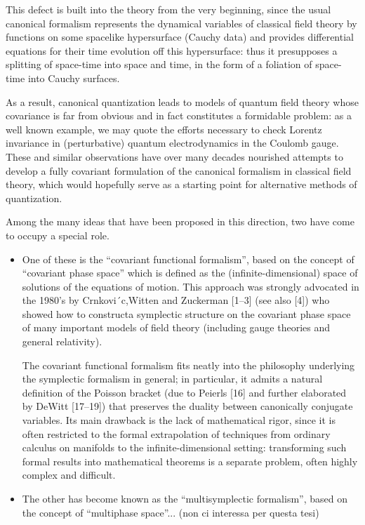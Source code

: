 \documentclass[Cascione]{subfiles}
\begin{document}
			This defect is built into the theory from the very beginning, since the usual canonical formalism represents the dynamical variables of classical field theory by functions on some spacelike hypersurface (Cauchy data) and provides differential equations for their time evolution off this hypersurface: thus it presupposes a splitting of space-time into space and time, in the form of a foliation of space-time into Cauchy surfaces.
			
			As a result, canonical quantization leads to models of quantum field theory whose covariance is far from obvious and in fact constitutes a formidable problem: as a well known example, we may quote the efforts necessary to check Lorentz invariance in (perturbative) quantum electrodynamics in the Coulomb gauge. \\
			These and similar observations have over many decades nourished attempts to develop a fully covariant formulation of the canonical formalism in classical field theory, which would hopefully serve as a starting point for alternative methods of quantization.
			
			Among the many ideas that have been proposed in this direction, two have come to occupy a special role. 
			\begin{itemize}
				\item  One of these is the “covariant functional formalism”, based on the concept 	of “covariant phase space” which is defined as the (infinite-dimensional) space of solutions of the equations of motion.
					This approach was strongly advocated in the 1980’s by Crnkovi´c,Witten and Zuckerman [1–3] (see also [4]) who showed how to constructa symplectic structure on the covariant phase space of many important models of field theory (including gauge theories and general relativity).
				
					The covariant functional formalism fits neatly into the philosophy underlying the symplectic formalism in general; in particular, it admits a natural definition of the Poisson bracket (due to Peierls [16] and further elaborated by DeWitt [17–19]) that preserves the duality between canonically conjugate variables. 
					Its main drawback is the lack of mathematical rigor, since it is often restricted to the formal extrapolation of techniques from ordinary calculus on manifolds to the infinite-dimensional setting: transforming such formal results into mathematical theorems is a separate problem, often highly complex and difficult.
					
				\item The other has become known as the “multisymplectic formalism”, based on the concept of “multiphase space”... (non ci interessa per questa tesi)
			\end{itemize}			
\end{document}
